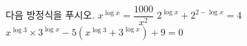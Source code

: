 다음 방정식을 푸시오.
 $x^{\log x}=\dfrac{1000}{x^2}$
 $2^{\log x}+2^{2-\log x}=4$
 $x^{\log 3}\times 3^{\log x}-5(x^{\log 3}+3^{\log x})+9=0$
